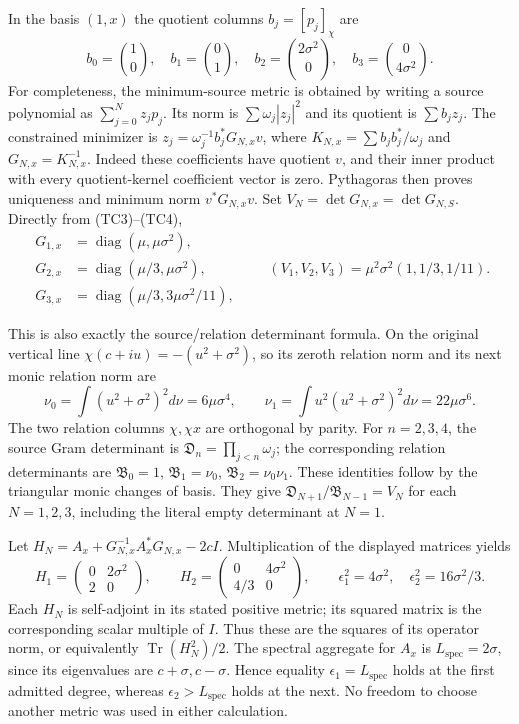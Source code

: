 In the basis $(1,x)$ the quotient columns $b_j=[p_j]_\chi$ are
\[
 b_0=\binom10,\quad b_1=\binom01,\quad
 b_2=\binom{2\sigma^2}0,\quad b_3=\binom0{4\sigma^2}.
 \tag{TC4}
\]
For completeness, the minimum-source metric is obtained by writing a
source polynomial as $\sum_{j=0}^N z_jp_j$. Its norm is
$\sum\omega_j|z_j|^2$ and its quotient is $\sum b_jz_j$.
The constrained minimizer is
$z_j=\omega_j^{-1}b_j^*G_{N,x}v$, where
$K_{N,x}=\sum b_jb_j^*/\omega_j$ and $G_{N,x}=K_{N,x}^{-1}$.
Indeed these coefficients have quotient $v$, and their inner product
with every quotient-kernel coefficient vector is zero. Pythagoras then
proves uniqueness and minimum norm $v^*G_{N,x}v$.
Set $V_N=\det G_{N,x}=\det G_{N,S}$. Directly from (TC3)--(TC4),
\[
 \begin{split}
 G_{1,x}&=\operatorname{diag}(\mu,\mu\sigma^2),\\
 G_{2,x}&=\operatorname{diag}(\mu/3,\mu\sigma^2),\\
 G_{3,x}&=\operatorname{diag}(\mu/3,3\mu\sigma^2/11),
 \end{split}\qquad
 (V_1,V_2,V_3)=\mu^2\sigma^2(1,1/3,1/11).
 \tag{TC5}
\]

This is also exactly the source/relation determinant formula. On the
original vertical line $\chi(c+iu)=-(u^2+\sigma^2)$, so its zeroth
relation norm and its next monic relation norm are
\[
 \nu_0=\int(u^2+\sigma^2)^2d\nu=6\mu\sigma^4,\qquad
 \nu_1=\int u^2(u^2+\sigma^2)^2d\nu=22\mu\sigma^6.
 \tag{TC6}
\]
The two relation columns $\chi,\chi x$ are orthogonal by parity.
For $n=2,3,4$, the source Gram determinant is
$\mathfrak D_n=\prod_{j<n}\omega_j$; the corresponding relation
determinants are $\mathfrak B_0=1$, $\mathfrak B_1=\nu_0$,
$\mathfrak B_2=\nu_0\nu_1$. These identities follow by the triangular
monic changes of basis. They give
$\mathfrak D_{N+1}/\mathfrak B_{N-1}=V_N$ for each $N=1,2,3$,
including the literal empty determinant at $N=1$.

Let $H_N=A_x+G_{N,x}^{-1}A_x^*G_{N,x}-2cI$. Multiplication of the
displayed matrices yields
\[
 H_1=\begin{pmatrix}0&2\sigma^2\\2&0\end{pmatrix},\qquad
 H_2=\begin{pmatrix}0&4\sigma^2\\4/3&0\end{pmatrix},\qquad
 \epsilon_1^2=4\sigma^2,\quad\epsilon_2^2=16\sigma^2/3.
 \tag{TC7}
\]
Each $H_N$ is self-adjoint in its stated positive metric; its squared
matrix is the corresponding scalar multiple of $I$. Thus these are
the squares of its operator norm, or equivalently
$\operatorname{Tr}(H_N^2)/2$. The spectral aggregate for $A_x$ is
$L_{\mathrm{spec}}=2\sigma$, since its eigenvalues are $c+\sigma,c-\sigma$.
Hence equality $\epsilon_1=L_{\mathrm{spec}}$ holds at the first admitted degree,
whereas $\epsilon_2>L_{\mathrm{spec}}$ holds at the next. No freedom to choose another
metric was used in either calculation.

